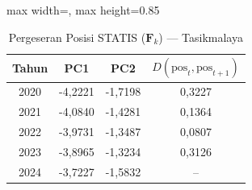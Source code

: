 \begin{table}[H]
\centering
\caption{Pergeseran Posisi STATIS ($\mathbf{F}_k$) --- Tasikmalaya} \label{tab:app2jarak_statis_skor_tasikmalaya}
\begin{adjustbox}{max width=\textwidth, max height=0.85\textheight}
\begin{tabular}{|c|c|c|c|}
\hline
\textbf{Tahun} & \textbf{PC1} & \textbf{PC2} & \textbf{$D(\text{pos}_t, \text{pos}_{t+1})$} \\
\hline
2020 & -4,2221 & -1,7198 & 0,3227 \\
2021 & -4,0840 & -1,4281 & 0,1364 \\
2022 & -3,9731 & -1,3487 & 0,0807 \\
2023 & -3,8965 & -1,3234 & 0,3126 \\
2024 & -3,7227 & -1,5832 & -- \\
\hline
\end{tabular}
\end{adjustbox}
\end{table}